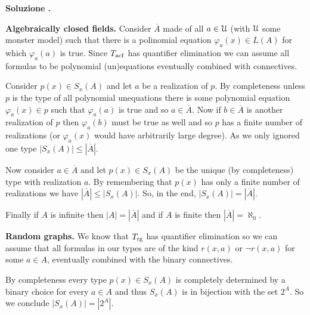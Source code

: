 \documentclass[10pt]{article}
\def\U{\EuScript U}
\newcounter{ex}
\newcounter{sol}
\newenvironment{solution}{\addtocounter{sol}{1}\textbf{Soluzione \theex.\quad}}{}
\begin{document}
\begin{solution}

  \textbf{Algebraically closed fields.}
  Consider \(\overline{A}\) made of all \(a\in\U\) (with \(\U\) some monster model) such that there is a polinomial equation \(\varphi_a(x)\in L(A)\) for which \(\varphi_a(a)\) is true.
  Since \(T_{\rm acf}\) has quantifier elimination we can assume all formulas to be polynomial (un)equations eventually combined with connectives.

  Consider \(p(x)\in S_x(A)\) and let \(a\) be a realization of \(p\).
  By completeness unless \(p\) is the type of all polynomial unequations there is some polynomial equation \(\varphi_a(x)\in p\) such that \(\varphi_a(a)\) is true and so \(a\in\overline{A}\).
  Now if \(b\in\overline{A}\) is another realization of \(p\) then \(\varphi_a(b)\) must be true as well and so \(p\) has a finite number of realizations (or \(\varphi_a(x)\) would have arbitrarily large degree).
  As we only ignored one type \(|S_x(A)| \leq |\overline{A}|\).

  Now consider \(a\in\overline{A}\) and let \(p(x)\in S_x(A)\) be the unique (by completeness) type with realization \(a\).
  By remembering that \(p(x)\) has only a finite number of realizations we have \(|\overline{A}| \leq |S_x(A)|\).
  So, in the end, \(|S_x(A)| = |\overline{A}|\).

  Finally if \(A\) is infinite then \(|A| = |\overline{A}|\) and if \(A\) is finite then \(|\overline{A}|=\aleph_0\).

  \textbf{Random graphs.}
  We know that \(T_{\rm rg}\) has quantifier elimination so we can assume that all formulas in our types are of the kind \(r(x, a)\) or \(\neg r(x,a)\) for some \(a\in A\), eventually combined with the binary connectives.

  By completeness every type \(p(x)\in S_x(A)\) is completely determined by a binary choice for every \(a\in A\) and thus \(S_x(A)\) is in bijection with the set \(2^A\).
  So we conclude \(|S_x(A)| = |2^A|\).
\end{solution}
\end{document}
